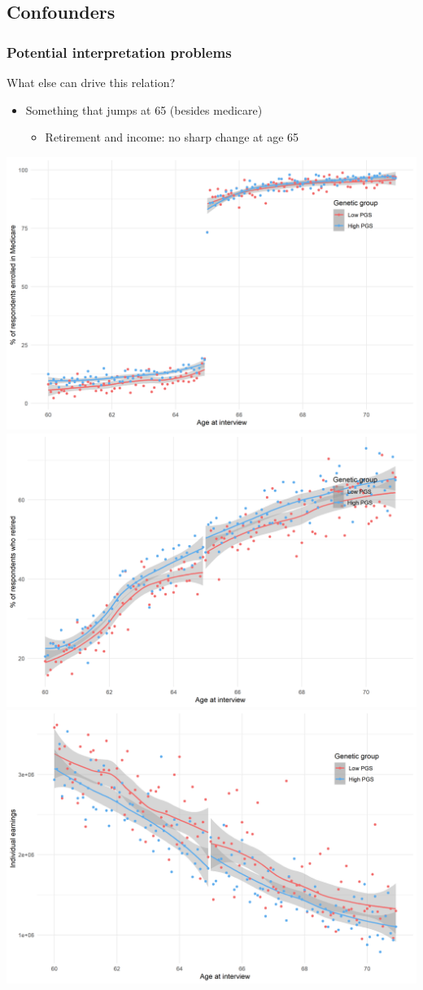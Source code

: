 \documentclass[10pt,compress,xcolor=dvipsnames,aspectratio=169]{beamer}    %
\newcounter{ex}
\newcommand{\1}[1]{\mathrm{1\hspace*{-2.5pt}l}[#1]}	%
\begin{document}
\subsection{Confounders}
\begin{frame}
\frametitle{Potential interpretation problems}
\label{frame:interpret}
What else can drive this relation?
\begin{itemize}
	\item Something that jumps at 65 (besides medicare)
	\begin{itemize}
		\item Retirement and income: no sharp change at age 65 \cite{Card2008,Card2009medicare}
	\end{itemize}
\end{itemize}

\vspace{4ex}

\hspace*{-6ex}
\includegraphics[width=.36\textwidth]{../../3_output/over_time/graph_6070govmrrdd_agebypgs.png}%
\includegraphics[width=.36\textwidth]{../../3_output/over_time/graph_6070retiredrdd_agebypgs.png}%
\includegraphics[width=.36\textwidth]{../../3_output/over_time/graph_6070iearnrdd_agebypgs.png}


\end{frame}
\end{document}
